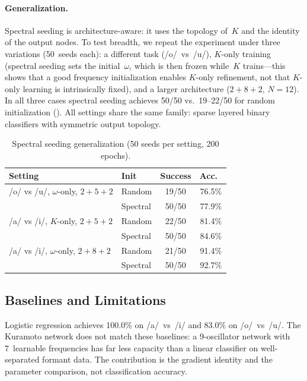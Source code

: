 \documentclass[11pt,a4paper]{article}
\begin{document}
\paragraph{Generalization.} Spectral seeding is architecture-aware: it
uses the topology of~$K$ and the identity of the output nodes. To test
breadth, we repeat the experiment under three variations (50~seeds
each): a different task (/o/~vs~/u/), $K$-only training (spectral
seeding sets the initial~$\omega$, which is then frozen while~$K$
trains---this shows that a good frequency initialization enables
$K$-only refinement, not that $K$-only learning is intrinsically
fixed), and a larger architecture ($2{+}8{+}2$, $N{=}12$). In all
three cases spectral seeding achieves 50/50 vs.\ 19--22/50 for random
initialization (). All settings share the same
family: sparse layered binary classifiers with symmetric output
topology.

\begin{table}[t]
  \centering
  \caption{%
    Spectral seeding generalization (50 seeds per setting, 200 epochs).
  }
  \label{tab:spectral-gen}
  \begin{tabular}{@{}llcc@{}}
    \toprule
    Setting & Init & Success & Acc.\ \\
    \midrule
    /o/ vs /u/, $\omega$-only, $2{+}5{+}2$
      & Random   & 19/50 & 76.5\% \\
      & Spectral & 50/50 & 77.9\% \\
    \midrule
    /a/ vs /i/, $K$-only, $2{+}5{+}2$
      & Random   & 22/50 & 81.4\% \\
      & Spectral & 50/50 & 84.6\% \\
    \midrule
    /a/ vs /i/, $\omega$-only, $2{+}8{+}2$
      & Random   & 21/50 & 91.4\% \\
      & Spectral & 50/50 & 92.7\% \\
    \bottomrule
  \end{tabular}
\end{table}

\subsection{Baselines and Limitations}

Logistic regression achieves 100.0\% on /a/~vs~/i/ and 83.0\% on
/o/~vs~/u/. The Kuramoto network does not match these baselines: a
9-oscillator network with 7~learnable frequencies has far less capacity
than a linear classifier on well-separated formant data. The contribution
is the gradient identity and the parameter comparison, not classification
accuracy.
\end{document}
